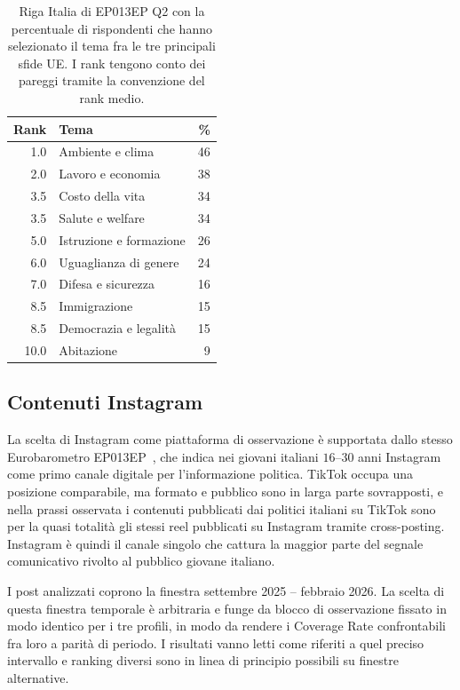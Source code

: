 \documentclass[11pt, a4paper]{article}
\begin{document}
\begin{table}[!htbp]
\centering
\caption{Riga Italia di EP013EP Q2 con la percentuale di rispondenti che
hanno selezionato il tema fra le tre principali sfide UE. I rank tengono
conto dei pareggi tramite la convenzione del rank medio.}
\label{tab:youth}
\small
\begin{tabular}{r l r}
\toprule
\textbf{Rank} & \textbf{Tema} & \textbf{\%} \\
\midrule
 1.0 & Ambiente e clima         & 46 \\
 2.0 & Lavoro e economia        & 38 \\
 3.5 & Costo della vita         & 34 \\
 3.5 & Salute e welfare         & 34 \\
 5.0 & Istruzione e formazione  & 26 \\
 6.0 & Uguaglianza di genere    & 24 \\
 7.0 & Difesa e sicurezza       & 16 \\
 8.5 & Immigrazione             & 15 \\
 8.5 & Democrazia e legalit\`a  & 15 \\
10.0 & Abitazione               &  9 \\
\bottomrule
\end{tabular}
\end{table}

\subsection{Contenuti Instagram}

La scelta di Instagram come piattaforma di osservazione \`e supportata
dallo stesso Eurobarometro EP013EP~\cite{ep2024youth}, che indica nei
giovani italiani $16$--$30$ anni Instagram come primo canale digitale
per l'informazione politica. TikTok occupa una posizione comparabile,
ma formato e pubblico sono in larga parte sovrapposti, e nella prassi
osservata i contenuti pubblicati dai politici italiani su TikTok sono
per la quasi totalit\`a gli stessi reel pubblicati su Instagram tramite
cross-posting. Instagram \`e quindi il canale singolo che cattura la
maggior parte del segnale comunicativo rivolto al pubblico giovane
italiano.

I post analizzati coprono la finestra settembre 2025 -- febbraio 2026.
La scelta di questa finestra temporale \`e arbitraria e funge da blocco
di osservazione fissato in modo identico per i tre profili, in modo da
rendere i Coverage Rate confrontabili fra loro a parit\`a di periodo. I
risultati vanno letti come riferiti a quel preciso intervallo e ranking
diversi sono in linea di principio possibili su finestre alternative.
\end{document}

